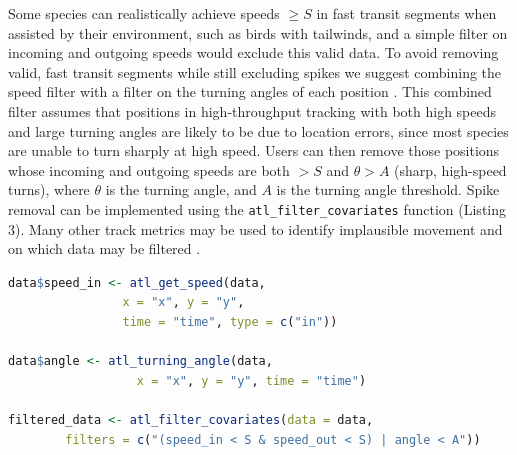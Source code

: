 \documentclass[10pt,paper=a4,headings=standardclasses
]{scrartcl}
\begin{document}
Some species can realistically achieve speeds $\geq S$ in fast transit segments when assisted by their environment, such as birds with tailwinds, and a simple filter on incoming and outgoing speeds would exclude this valid data.
To avoid removing valid, fast transit segments while still excluding spikes we suggest combining the speed filter with a filter on the turning angles of each position \citep[see][]{calenge2009}.
This combined filter assumes that positions in high-throughput tracking with both high speeds and large turning angles are likely to be due to location errors, since most species are unable to turn sharply at high speed.
Users can then remove those positions whose incoming and outgoing speeds are both $> S$ and $\theta > A$ (sharp, high-speed turns), where $\theta$ is the turning angle, and $A$ is the turning angle threshold.
Spike removal can be implemented using the \texttt{atl\_filter\_covariates} function (Listing 3).
Many other track metrics may be used to identify implausible movement and on which data may be filtered \citep{seidel2018}.

\begin{lstlisting}[float, language=R, style=customR, caption = {
    Filtering a movement track on incoming and outgoing speeds, and on turning angle to remove unrealistic movement.
    The functions \texttt{atl\_get\_speed} and \texttt{atl\_turning\_angle} are used to get the speeds and turning angles before filtering, and assigned to a column in the data (assignment of \texttt{speed\_out} is not shown).
    The filter step only retains positions with speeds below the speed threshold $S$ \textit{or} angles above the turning angle threshold $\theta$, i.e., positions where the animal is slow but makes sharp turns, and data where the animal moves quickly in a relatively straight line.}]
data$speed_in <- atl_get_speed(data,
                x = "x", y = "y",
                time = "time", type = c("in"))

data$angle <- atl_turning_angle(data,
                  x = "x", y = "y", time = "time")

filtered_data <- atl_filter_covariates(data = data,
        filters = c("(speed_in < S & speed_out < S) | angle < A"))
\end{lstlisting}
\end{document}

